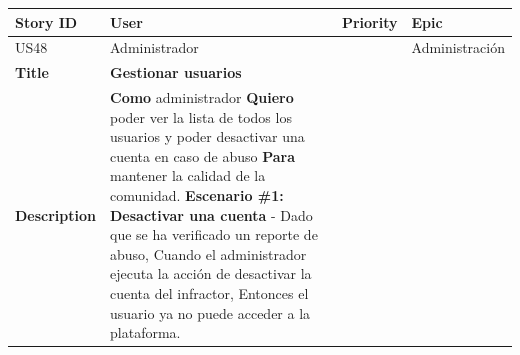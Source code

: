{\def\LTcaptype{none} %
\begin{longtable}[]{@{}
  >{\raggedright\arraybackslash}p{}
  >{\raggedright\arraybackslash}p{}
  >{\raggedright\arraybackslash}p{}
  >{\raggedright\arraybackslash}p{}@{}}
\toprule\noalign{}
\begin{minipage}[b]{\linewidth}\raggedright
Story ID
\end{minipage} & \begin{minipage}[b]{\linewidth}\raggedright
User
\end{minipage} & \begin{minipage}[b]{\linewidth}\raggedright
Priority
\end{minipage} & \begin{minipage}[b]{\linewidth}\raggedright
Epic
\end{minipage} \\
\midrule\noalign{}
\endhead
\bottomrule\noalign{}
\endlastfoot
US48 & Administrador & 5 & Administración \\
\textbf{Title} & \textbf{Gestionar usuarios} & & \\
\textbf{Description} & \textbf{Como} administrador \textbf{Quiero} poder
ver la lista de todos los usuarios y poder desactivar una cuenta en caso
de abuso \textbf{Para} mantener la calidad de la comunidad.
\textbf{Escenario \#1: Desactivar una cuenta} - Dado que se ha
verificado un reporte de abuso, Cuando el administrador ejecuta la
acción de desactivar la cuenta del infractor, Entonces el usuario ya no
puede acceder a la plataforma. & & \\
\end{longtable}
}

